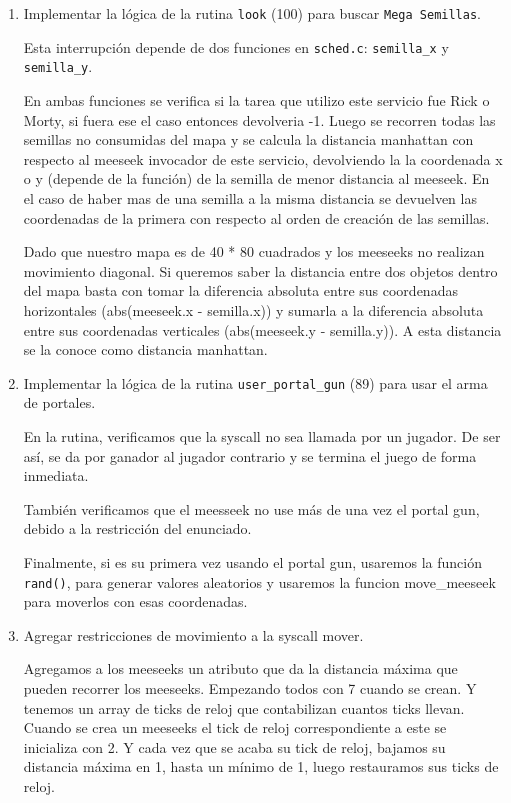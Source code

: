\documentclass[a4paper]{article}
\begin{document}
\begin{enumerate}
	\item Implementar la lógica de la rutina \texttt{look} (100) para buscar \texttt{Mega Semillas}.
	
	Esta interrupción depende de dos funciones en \texttt{sched.c}: \texttt{semilla\_x} y \texttt{semilla\_y}.
	
	En ambas funciones se verifica si la tarea que utilizo este servicio fue Rick o Morty, si fuera ese el caso entonces devolveria -1. Luego se recorren todas las semillas no consumidas del mapa y se calcula la distancia manhattan con respecto al meeseek invocador de este servicio, devolviendo la la coordenada x o y (depende de la funci\'on) de la semilla de menor distancia al meeseek.
	En el caso de haber mas de una semilla a la misma distancia se devuelven las coordenadas de la primera con respecto al orden de creación de las semillas.
	
	Dado que nuestro mapa es de 40 * 80 cuadrados y los meeseeks no realizan movimiento diagonal. Si queremos saber la distancia entre dos objetos dentro del mapa basta con tomar la diferencia absoluta entre sus coordenadas horizontales (abs(meeseek.x - semilla.x)) y sumarla a la diferencia absoluta entre sus coordenadas verticales (abs(meeseek.y - semilla.y)). A esta distancia se la conoce como distancia manhattan.
	
	\item Implementar la lógica de la rutina \texttt{user\_portal\_gun} (89) para usar el arma de portales.
	
	En la rutina, verificamos que la syscall no sea llamada por un jugador. De ser así, se da por ganador al jugador contrario y se termina el juego de forma inmediata.
	
	También verificamos que el meesseek no use m\'as de una vez el portal gun, debido a la restricción del enunciado.
	
	Finalmente, si es su primera vez usando el portal gun, usaremos la funci\'on \texttt{rand()}, para generar valores aleatorios y usaremos la funcion move\_meeseek para moverlos con esas coordenadas.
	
	\item Agregar restricciones de movimiento a la syscall mover.
	
	Agregamos a los meeseeks un atributo que da la distancia m\'axima que pueden recorrer los meeseeks. Empezando todos con 7 cuando se crean. Y tenemos un array de ticks de reloj que contabilizan cuantos ticks llevan. Cuando se crea un meeseeks el tick de reloj correspondiente a este se inicializa con 2. Y cada vez que se acaba su tick de reloj, bajamos su distancia m\'axima en 1, hasta un m\'inimo de 1, luego restauramos sus ticks de reloj.
	

\end{enumerate}
\end{document}
